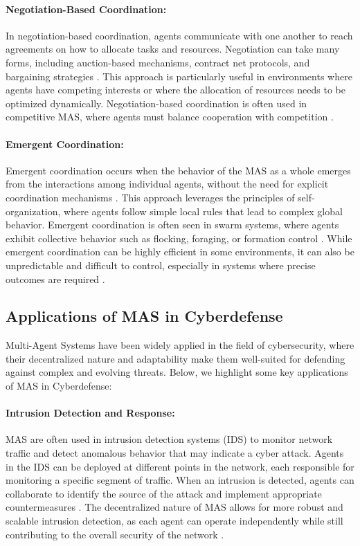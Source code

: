 \paragraph{Negotiation-Based Coordination:}
In negotiation-based coordination, agents communicate with one another to reach agreements on how to allocate tasks and resources. Negotiation can take many forms, including auction-based mechanisms, contract net protocols, and bargaining strategies \cite{durfee1989negotiating}. This approach is particularly useful in environments where agents have competing interests or where the allocation of resources needs to be optimized dynamically. Negotiation-based coordination is often used in competitive MAS, where agents must balance cooperation with competition \cite{weiss1999multiagent}.

\paragraph{Emergent Coordination:}
Emergent coordination occurs when the behavior of the MAS as a whole emerges from the interactions among individual agents, without the need for explicit coordination mechanisms \cite{dorigo2000ant}. This approach leverages the principles of self-organization, where agents follow simple local rules that lead to complex global behavior. Emergent coordination is often seen in swarm systems, where agents exhibit collective behavior such as flocking, foraging, or formation control \cite{weiss1999multiagent}. While emergent coordination can be highly efficient in some environments, it can also be unpredictable and difficult to control, especially in systems where precise outcomes are required \cite{dorigo2000ant}.

\subsection{Applications of MAS in Cyberdefense}

Multi-Agent Systems have been widely applied in the field of cybersecurity, where their decentralized nature and adaptability make them well-suited for defending against complex and evolving threats. Below, we highlight some key applications of MAS in Cyberdefense:

\paragraph{Intrusion Detection and Response:}
MAS are often used in intrusion detection systems (IDS) to monitor network traffic and detect anomalous behavior that may indicate a cyber attack. Agents in the IDS can be deployed at different points in the network, each responsible for monitoring a specific segment of traffic. When an intrusion is detected, agents can collaborate to identify the source of the attack and implement appropriate countermeasures \cite{kolias2011swarm}. The decentralized nature of MAS allows for more robust and scalable intrusion detection, as each agent can operate independently while still contributing to the overall security of the network \cite{kolias2011swarm}.

